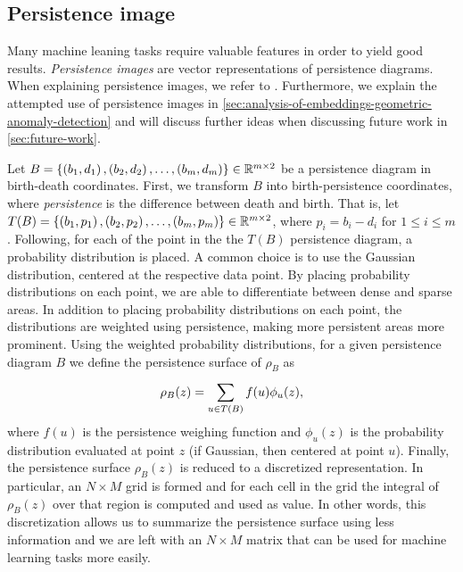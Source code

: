 \subsection{Persistence image}
\label{sec:persistence-image}
Many machine leaning tasks require valuable features in order to yield good results. \textit{Persistence images} \cite{adams2016persistence} are vector representations of persistence diagrams. When explaining persistence images, we refer to \cite{adams2016persistence}. Furthermore, we explain the attempted use of persistence images in \cref{sec:analysis-of-embeddings-geometric-anomaly-detection} and will discuss further ideas when discussing future work in \cref{sec:future-work}.

Let $B = \left\{\left(b_1, d_1\right), \left(b_2, d_2\right), \ldots, \left(b_m, d_m\right)\right\} \in \mathbb{R}^{m \times 2}$ be a persistence diagram in birth-death coordinates. First, we transform $B$ into birth-persistence coordinates, where \textit{persistence} is the difference between death and birth. That is, let $T(B) = \left\{\left(b_1, p_1\right), \left(b_2, p_2\right), \ldots, \left(b_m, p_m\right)\right\} \in \mathbb{R}^{m \times 2}$, where $p_i = b_i - d_i$ for $1 \leq i \leq m$. Following, for each of the point in the the $T(B)$ persistence diagram, a probability distribution is placed. A common choice is to use the Gaussian distribution, centered at the respective data point. By placing probability distributions on each point, we are able to differentiate between dense and sparse areas. In addition to placing probability distributions on each point, the distributions are weighted using persistence, making more persistent areas more prominent. Using the weighted probability distributions, for a given persistence diagram $B$ we define the persistence surface of $\rho_B$ as
\begin{align}
    \rho_B(z) = \sum\limits_{u \in T(B)}^{} f(u) \phi_u(z),
\end{align}
where $f(u)$ is the persistence weighing function and $\phi_u(z)$ is the probability distribution evaluated at point $z$ (if Gaussian, then centered at point $u$). Finally, the persistence surface $\rho_B(z)$ is reduced to a discretized representation. In particular, an $N \times M$ grid is formed and for each cell in the grid the integral of $\rho_B(z)$ over that region is computed and used as value. In other words, this discretization allows us to summarize the persistence surface using less information and we are left with an $N \times M$ matrix that can be used for machine learning tasks more easily.

